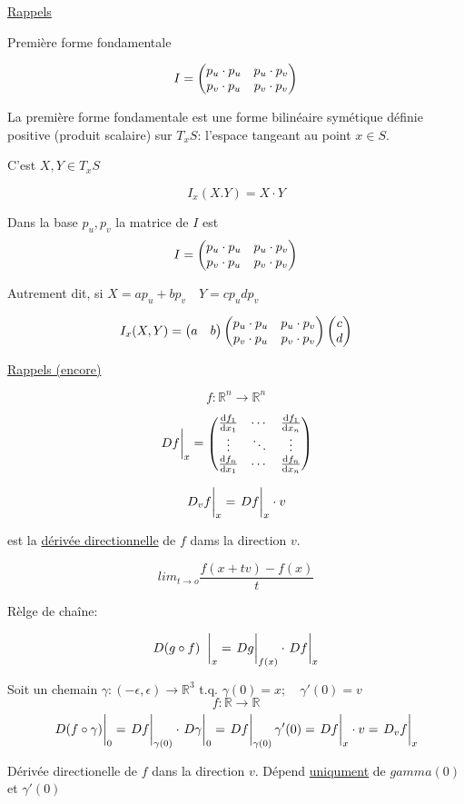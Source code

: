 



\underline{Rappels} 

Première forme fondamentale

$$I = \begin{pmatrix} p_{u}\cdot p_{u} & p_{u}\cdot p_{v}\\ p_{v}\cdot p_{u}& p_{v}\cdot p_{v} \end{pmatrix}$$ 

La première forme fondamentale est une forme bilinéaire symétique définie positive (produit scalaire) sur $T_{x} S$: l'espace tangeant au point $x\in S$.

C'est $X,Y \in T_{x}S$ 

$$I_{x}(X.Y) = X\cdot Y$$ 

Dans la base $p_{u},p_{v}$ la matrice de $I$ est  
$$I = \begin{pmatrix} p_{u}\cdot p_{u} & p_{u}\cdot p_{v}\\ p_{v}\cdot p_{u}& p_{v}\cdot p_{v} \end{pmatrix}$$ 

Autrement dit, si  $X= ap_{u}+bp_{v}\quad Y = cp_{u}dp_{v}$ 

$$I_{x}(X,Y) =\begin{pmatrix} a & b \end{pmatrix} \begin{pmatrix} p_{u}\cdot p_{u} & p_{u}\cdot p_{v}\\ p_{v}\cdot p_{u}& p_{v}\cdot p_{v} \end{pmatrix} \begin{pmatrix} c\\d \end{pmatrix}$$ 

\underline{Rappels (encore)} 

$$f: \mathbb{R}^n \to \mathbb{R}^n$$ 

$$\eval{Df}_x = \cols{\dv{f_1}{x_1} & \dotsb & \dv{f_1}{x_n}\\ \vdots & \ddots & \vdots \\ \dv{f_n}{x_1} & \dotsb &\dv{f_n}{x_n}}$$ 


$$\eval{D_vf}_x = \eval{Df}_x \cdot v$$

est la \underline{dérivée directionnelle} de $f$ dams la direction $v$.

$$lim_{t\to o} \frac{f(x + tv) - f(x)}{t}$$ 


Rèlge de chaîne:

$$D(g \circ f)\eval{\;}_x= \eval{Dg}_{f(x)} \cdot \eval{Df}_x$$ 


\begin{tcolorbox}[title=Remarge]
	Soit un chemain $\gamma:(-\epsilon, \epsilon) \to \mathbb{R}^3$ t.q. $\gamma(0)=x; \quad \gamma'(0)= v$  	
$$f: \mathbb{R} \to \mathbb{R}$$ 
$$\eval{D(f\circ \gamma)}_0 = \eval{Df}_{\gamma(0)} \cdot \eval{D\gamma}_0 = \eval{Df}_{\gamma(0)} \gamma'(0) = \eval{Df}_x \cdot v = \eval{D_{v}f}_x$$ 

Dérivée directionelle de $f$ dans la direction $v$. Dépend \underline{uniqument} de $gamma(0)$ et  $\gamma'(0)$     

\end{tcolorbox}


